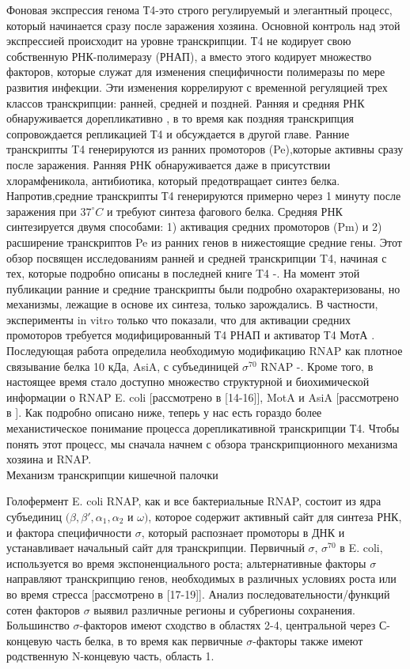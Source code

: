 \documentclass[a4paper,12pt]{article}
\begin{document}
    \par{
    Фоновая экспрессия генома Т4-это строго регулируемый и элегантный процесс, который начинается сразу после заражения
    хозяина. Основной контроль над этой экспрессией происходит на уровне транскрипции. Т4 не кодирует свою собственную
    РНК-полимеразу (РНАП), а вместо этого кодирует множество факторов, которые служат для изменения специфичности
    полимеразы по мере развития инфекции. Эти изменения коррелируют с временной регуляцией трех классов транскрипции:
    ранней, средней и поздней. Ранняя и средняя РНК обнаруживается дорепликативно
    \cite{hinton1,hinton2,hinton3,hinton4,hinton5,hinton6}, в то время как поздняя транскрипция сопровождается
    репликацией Т4 и обсуждается в другой главе. Ранние транскрипты T4 генерируются из ранних промоторов (Pe),которые активны сразу после заражения. Ранняя РНК обнаруживается даже в присутствии хлорамфеникола, антибиотика, который
    предотвращает синтез белка. Напротив,средние транскрипты Т4 генерируются примерно через 1 минуту после заражения при
    \(37^\circ C\)  и требуют синтеза фагового белка. Средняя РНК синтезируется двумя способами: 1) активация средних
    промоторов (Pm) и 2) расширение транскриптов Pe из ранних генов в нижестоящие средние гены. Этот обзор посвящен
    исследованиям ранней и средней транскрипции T4, начиная с тех, которые подробно описаны в последней книге T4
    \cite{hinton1}-\cite{hinton5}. На момент этой публикации ранние и средние транскрипты были подробно охарактеризованы,
    но механизмы, лежащие в основе их синтеза, только зарождались. В частности, эксперименты in vitro только что
    показали, что для активации средних промоторов требуется модифицированный Т4 РНАП и активатор Т4 МотА
    \cite{hinton7,hinton8}. Последующая работа определила необходимую модификацию RNAP как плотное связывание белка 10
    кДа, AsiA, с субъединицей \(\sigma^{70}\) RNAP \cite{hinton9}-\cite{hinton13}. Кроме того, в настоящее время стало
    доступно множество структурной и биохимической информации о RNAP E. coli [рассмотрено в [14-16]], MotA и AsiA
    [рассмотрено в \cite{hinton2}]. Как подробно описано ниже, теперь у нас есть гораздо более механистическое понимание
    процесса дорепликативной транскрипции Т4. Чтобы понять этот процесс, мы сначала начнем с обзора транскрипционного
    механизма хозяина и RNAP.} \\ 
    {\Large Механизм транскрипции кишечной палочки }
    \par{Голофермент E. coli RNAP, как и все бактериальные RNAP, состоит из ядра субъединиц \((\beta,\beta',\alpha_1,\alpha_2\) и \(\omega)\), которое содержит активный сайт для синтеза РНК, и фактора специфичности \(\sigma\), который распознает промоторы в ДНК и устанавливает начальный сайт для транскрипции. Первичный \(\sigma\), \(\sigma^{70}\) в E. coli, используется во время экспоненциального роста; альтернативные факторы \(\sigma\) направляют транскрипцию генов, необходимых в различных условиях роста или во время стресса [рассмотрено в [17-19]]. Анализ последовательности/функций сотен факторов \(\sigma\) выявил различные регионы и субрегионы сохранения. Большинство \(\sigma\)-факторов имеют сходство в областях 2-4, центральной через С-концевую часть белка, в то время как первичные \(\sigma\)-факторы также имеют родственную N-концевую часть, область 1.}
\end{document}
